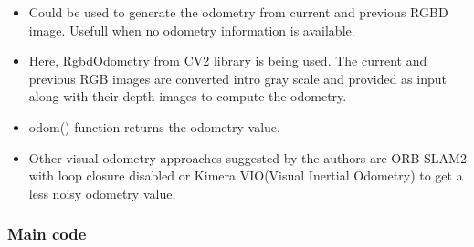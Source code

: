 \documentclass[report.tex]{subfiles}
\begin{document}
\begin{itemize}
\item Could be used to generate the odometry from current and previous RGBD image. Usefull when no odometry information is available.
\item Here, RgbdOdometry from CV2 library is being used. The current and previous RGB images are converted intro gray scale and provided as input along with their depth images to compute the odometry.
\item odom() function returns the odometry value.
\item Other visual odometry approaches suggested by the authors are ORB-SLAM2 with loop closure disabled or Kimera VIO(Visual Inertial Odometry) to get a less noisy odometry value.
\end{itemize}

\subsubsection{Main code}
\end{document}
